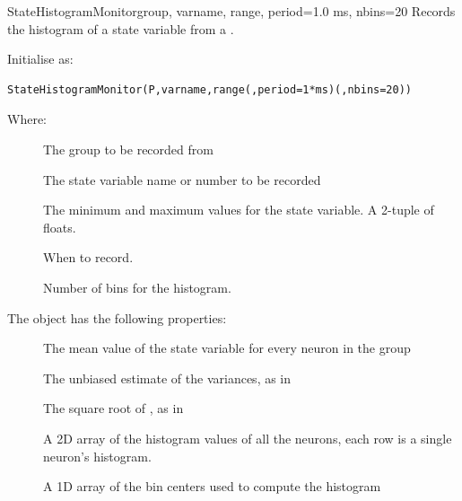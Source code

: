 \documentclass[letterpaper,10pt,english]{manual}
\begin{document}
\hypertarget{brian.StateHistogramMonitor}{}\begin{classdesc}{StateHistogramMonitor}{group, varname, range, period=1.0 ms, nbins=20}
Records the histogram of a state variable from a \hyperlink{brian.NeuronGroup}{}.

Initialise as:

\begin{Verbatim}[commandchars=@\[\]]
StateHistogramMonitor(P,varname,range(,period=1*ms)(,nbins=20))
\end{Verbatim}

Where:
\begin{description}
\item[] \leavevmode
The group to be recorded from

\item[] \leavevmode
The state variable name or number to be recorded

\item[] \leavevmode
The minimum and maximum values for the state variable. A 2-tuple of floats.

\item[] \leavevmode
When to record.

\item[] \leavevmode
Number of bins for the histogram.

\end{description}

The \hyperlink{brian.StateHistogramMonitor}{} object has the following properties:
\begin{description}
\item[] \leavevmode
The mean value of the state variable for every neuron in the
group

\item[] \leavevmode
The unbiased estimate of the variances, as in 

\item[] \leavevmode
The square root of , as in 

\item[] \leavevmode
A 2D array of the histogram values of all the neurons, each row is a
single neuron's histogram.

\item[] \leavevmode
A 1D array of the bin centers used to compute the histogram


\end{description}
\end{classdesc}
\end{document}
